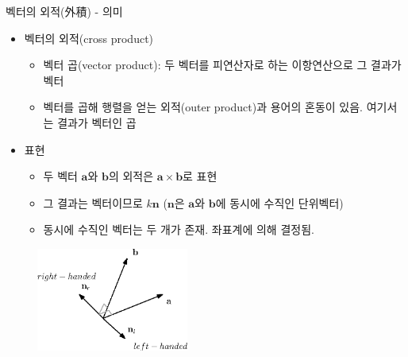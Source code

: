 \documentclass{beamer}
\begin{document}
\begin{frame}{벡터의 외적(外積) - 의미}

\begin{itemize}
\item 벡터의 외적(cross product)
	\begin{itemize}
	\item 벡터 곱(vector product): 두 벡터를 피연산자로 하는 이항연산으로 그 결과가 벡터
	\item 벡터를 곱해 행렬을 얻는 외적(outer product)과 용어의 혼동이 있음. 여기서는 결과가 벡터인 곱
	\end{itemize}
\item 표현
	\begin{itemize}
	\item 두 벡터 $\mathbf a$와 $\mathbf b$의 외적은 $\mathbf a \times \mathbf b$로 표현
	\item 그 결과는 벡터이므로 $k \mathbf n$ ($\mathbf n$은 $\mathbf a$와 $\mathbf b$에 동시에 수직인 단위벡터)
	\item 동시에 수직인 벡터는 두 개가 존재. 좌표계에 의해 결정됨.
	\end{itemize}
\end{itemize}

\begin{figure}
\includegraphics[width=5cm]{Math_vector/crossProductDir.eps}
\end{figure}

\end{frame}
\end{document}
